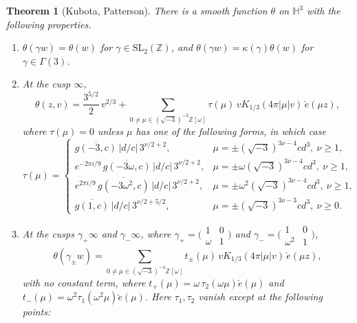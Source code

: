 \documentclass[11pt]{article}
\numberwithin{equation}{section}
\newcommand{\OO}{\mathbb Z[\omega]}
\newcommand{\Z}{\mathbb Z}
\newtheorem{theorem}{Theorem}
\theoremstyle{definition}
\theoremstyle{remark}
\begin{document}
\begin{theorem}[Kubota, Patterson]\label{thm:theta}
There is a smooth function $\theta$ on $\mathbb H^3$ with the following properties.
\begin{enumerate}
\item[\textup{(T1)}] $\theta(\gamma w)=\theta(w)$ for $\gamma\in\mathrm{SL}_2(\Z)$, and $\theta(\gamma w)=\kappa(\gamma)\theta(w)$ for $\gamma\in\Gamma(3)$.
\item[\textup{(T2)}] At the cusp $\infty$,
\begin{equation}\label{eq:thetaexp}
 \theta(z,v)=\frac{3^{5/2}}2\,v^{2/3}+\sum_{0\ne\mu\in(\sqrt{-3})^{-3}\OO}\tau(\mu)\,vK_{1/3}(4\pi|\mu|v)\,\breve e(\mu z),
\end{equation}
where $\tau(\mu)=0$ unless $\mu$ has one of the following forms, in which case
\begin{equation}\label{eq:tau}
 \tau(\mu)=\begin{cases}
 \overline{g(-3,c)}\,|d/c|\,3^{\nu/2+2},&\mu=\pm(\sqrt{-3})^{3\nu-4}cd^3,\ \nu\ge1,\\
 e^{-2\pi i/9}\,\overline{g(-3\omega,c)}\,|d/c|\,3^{\nu/2+2},&\mu=\pm\omega(\sqrt{-3})^{3\nu-4}cd^3,\ \nu\ge1,\\
 e^{2\pi i/9}\,\overline{g(-3\omega^2,c)}\,|d/c|\,3^{\nu/2+2},&\mu=\pm\omega^2(\sqrt{-3})^{3\nu-4}cd^3,\ \nu\ge1,\\
 \overline{g(1,c)}\,|d/c|\,3^{\nu/2+5/2},&\mu=\pm(\sqrt{-3})^{3\nu-3}cd^3,\ \nu\ge0.
 \end{cases}
\end{equation}
\item[\textup{(T3)}] At the cusps $\gamma_+\infty$ and $\gamma_-\infty$, where
$\gamma_+=\bigl(\begin{smallmatrix}1&0\\\omega&1\end{smallmatrix}\bigr)$ and $\gamma_-=\bigl(\begin{smallmatrix}1&0\\\omega^2&1\end{smallmatrix}\bigr)$,
\begin{equation}\label{eq:thetacusp}
 \theta(\gamma_\pm w)=\sum_{0\ne\mu\in(\sqrt{-3})^{-4}\OO}t_\pm(\mu)\,vK_{1/3}(4\pi|\mu|v)\,\breve e(\mu z),
\end{equation}
with no constant term, where $t_+(\mu)=\omega\,\tau_2(\omega\mu)\breve e(\mu)$ and $t_-(\mu)=\omega^2\tau_1(\omega^2\mu)\breve e(\mu)$.
Here $\tau_1,\tau_2$ vanish except at the following points:
\begin{gather}

\end{gather}
\end{enumerate}
\end{theorem}
\end{document}
